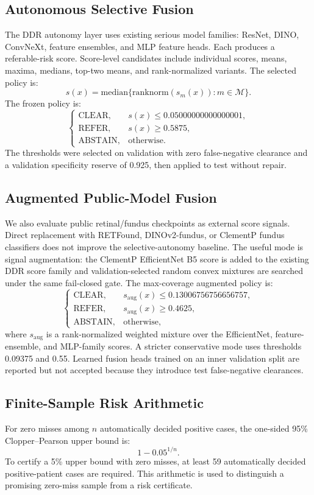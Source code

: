 \documentclass[journal]{IEEEtran}
\begin{document}
\subsection{Autonomous Selective Fusion}
The DDR autonomy layer uses existing serious model families: ResNet, DINO, ConvNeXt, feature ensembles, and MLP feature heads. Each produces a referable-risk score. Score-level candidates include individual scores, means, maxima, medians, top-two means, and rank-normalized variants. The selected policy is:
\[
s(x)=\mathrm{median}\{\mathrm{ranknorm}(s_m(x)):m\in\mathcal{M}\}.
\]
The frozen policy is:
\[
\begin{cases}
\mathrm{CLEAR}, & s(x)\leq 0.05000000000000001,\\
\mathrm{REFER}, & s(x)\geq 0.5875,\\
\mathrm{ABSTAIN}, & \mathrm{otherwise}.
\end{cases}
\]
The thresholds were selected on validation with zero false-negative clearance and a validation specificity reserve of 0.925, then applied to test without repair.

\subsection{Augmented Public-Model Fusion}
We also evaluate public retinal/fundus checkpoints as external score signals. Direct replacement with RETFound, DINOv2-fundus, or ClementP fundus classifiers does not improve the selective-autonomy baseline. The useful mode is signal augmentation: the ClementP EfficientNet B5 score is added to the existing DDR score family and validation-selected random convex mixtures are searched under the same fail-closed gate. The max-coverage augmented policy is:
\[
\begin{cases}
\mathrm{CLEAR}, & s_{\mathrm{aug}}(x)\leq 0.13006756756656757,\\
\mathrm{REFER}, & s_{\mathrm{aug}}(x)\geq 0.4625,\\
\mathrm{ABSTAIN}, & \mathrm{otherwise},
\end{cases}
\]
where $s_{\mathrm{aug}}$ is a rank-normalized weighted mixture over the EfficientNet, feature-ensemble, and MLP-family scores. A stricter conservative mode uses thresholds 0.09375 and 0.55. Learned fusion heads trained on an inner validation split are reported but not accepted because they introduce test false-negative clearances.

\subsection{Finite-Sample Risk Arithmetic}
For zero misses among $n$ automatically decided positive cases, the one-sided 95\% Clopper--Pearson upper bound is:
\[
1 - 0.05^{1/n}.
\]
To certify a 5\% upper bound with zero misses, at least 59 automatically decided positive-patient cases are required. This arithmetic is used to distinguish a promising zero-miss sample from a risk certificate.
\end{document}
